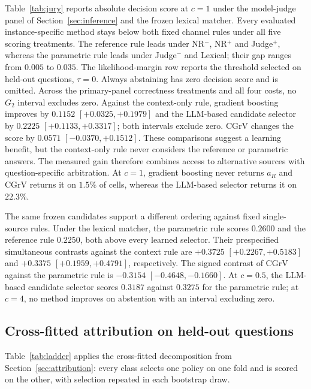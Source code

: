\documentclass[sigconf]{acmart}
\newcommand{\CGrV}{CGrV}
\newcommand{\ar}{a_R}
\begin{document}
Table~\ref{tab:jury} reports absolute decision score at $c{=}1$ under the
model-judge panel of Section~\ref{sec:inference} and the frozen lexical
matcher.
Every evaluated instance-specific method stays below both fixed channel rules under all five scoring treatments. 
The reference rule leads under NR$^-$, NR$^+$ and Judge$^+$, whereas the parametric rule leads under Judge$^-$ and Lexical; their gap ranges from $0.005$ to $0.035$. The likelihood-margin row reports the threshold selected on held-out questions, $\tau{=}0$. Always abstaining has zero decision score and is omitted. Across the primary-panel correctness treatments and all four costs, no $G_2$ interval excludes zero.
Against the
context-only rule, gradient boosting improves by $0.1152$
$[+0.0325,\allowbreak +0.1979]$ and the LLM-based candidate selector by
$0.2225$ $[+0.1133,\allowbreak +0.3317]$; both intervals exclude zero.
\CGrV{} changes the score by $0.0571$
$[-0.0370,\allowbreak +0.1512]$. These comparisons suggest a learning
benefit, but the context-only rule never considers the reference or
parametric answers. The measured gain therefore combines access to
alternative sources with question-specific arbitration.
At $c{=}1$, gradient boosting never returns $\ar$ and \CGrV{} returns it
on $1.5\%$ of cells, whereas the LLM-based selector returns it on
$22.3\%$.

The same frozen candidates support a different ordering against fixed
single-source rules. Under the lexical matcher, the parametric rule
scores $0.2600$ and the reference rule $0.2250$, both above every
learned selector. Their prespecified simultaneous contrasts against the
context rule are $+0.3725$ $[+0.2267,+0.5183]$ and $+0.3375$
$[+0.1959,+0.4791]$, respectively. The signed contrast of \CGrV{} against the parametric
rule is $-0.3154$ $[-0.4648,\allowbreak -0.1660]$. At $c{=}0.5$, the
LLM-based candidate selector scores $0.3187$ against $0.3275$ for the
parametric rule; at $c{=}4$, no method improves on abstention with an
interval excluding zero.

\subsection{Cross-fitted attribution on held-out questions}
\label{sec:res-ladder}

Table~\ref{tab:ladder} applies the cross-fitted decomposition from
Section~\ref{sec:attribution}: every class selects one policy on one
fold and is scored on the other, with selection repeated in each
bootstrap draw.
\end{document}
